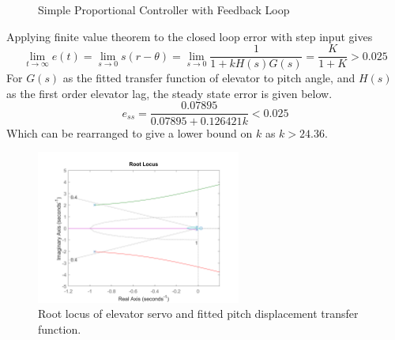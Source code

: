 \documentclass{article}
\begin{document}
\begin{figure}[H]
    \begin{center}
    \end{center}
    \caption{Simple Proportional Controller with Feedback Loop}\label{fig}
\end{figure}

Applying finite value theorem to the closed loop error with step input gives
\begin{equation}
    \lim_{t \to \infty} e(t) = \lim_{s \to 0} s (r - \theta) = \lim_{s \to 0} \frac{1}{1+kH(s)G(s)} = \frac{K}{1+K} > 0.025
\end{equation}
For $G(s)$ as the fitted transfer function of elevator to pitch angle, and $H(s)$ as the first order elevator lag, the steady state error is given below.
\begin{equation}
    e_{ss} = \frac{0.07895}{0.07895 + 0.126421 k} < 0.025
\end{equation}
Which can be rearranged to give a lower bound on $k$ as $k > 24.36$.

\begin{figure}[H]
    \centering
    \includegraphics[width=0.6\textwidth]{figures/pitch_autopilot_locus_bad.png}
    \caption{Root locus of elevator servo and fitted pitch displacement transfer function.}
    \label{fig:fitted_pitchrate_rlocus}
\end{figure}
\end{document}
